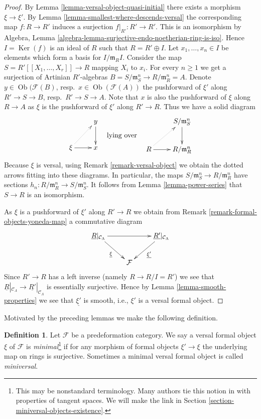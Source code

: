 \documentclass{stacks-project}
\theoremstyle{plain}
\theoremstyle{definition}
\newtheorem{definition}[subsection]{Definition}
\theoremstyle{remark}
\numberwithin{equation}{subsection}
\def\Ob{\mathop{\mathrm{Ob}}\nolimits}
\def\Ker{\mathop{\mathrm{Ker}}}
\begin{document}
\begin{proof}
By
Lemma \ref{lemma-versal-object-quasi-initial}
there exists a morphism $\xi \to \xi'$. By
Lemma \ref{lemma-smallest-where-descends-versal}
the corresponding map $f : R \to R'$ induces a surjection
$f|_{R'} : R' \to R'$. This is an isomorphism by
Algebra, Lemma \ref{algebra-lemma-surjective-endo-noetherian-ring-is-iso}.
Hence $I = \Ker(f)$ is an ideal of $R$ such that $R = R' \oplus I$.
Let $x_1, \ldots, x_n \in I$ be elements which form a basis for
$I/\mathfrak m_RI$. Consider the map
$S = R'[[X_1, \ldots, X_r]] \to R$ mapping $X_i$ to $x_i$.
For every $n \geq 1$ we get a surjection of Artinian $R'$-algebras
$B = S/\mathfrak m_S^n \to R/\mathfrak m_R^n = A$. Denote
$y \in \Ob(\mathcal{F}(B)$, resp.\ $x \in \Ob(\mathcal{F}(A))$
the pushforward of $\xi'$ along $R' \to S \to B$, resp.\ $R' \to S \to A$.
Note that $x$ is also the pushforward of $\xi$ along $R \to A$ as
$\xi$ is the pushforward of $\xi'$ along $R' \to R$.
Thus we have a solid diagram
$$
\vcenter{
\xymatrix{
& y \ar[d] \\
\xi \ar[r] \ar@{..>}[ru] & x
}
}
\quad\text{lying over}\quad
\vcenter{
\xymatrix{
& S/\mathfrak m_S^n \ar[d] \\
R \ar[r] \ar@{..>}[ru] & R/\mathfrak m_R^n
}
}
$$
Because $\xi$ is versal, using
Remark \ref{remark-versal-object}
we obtain the dotted arrows fitting into these diagrams.
In particular, the maps $S/\mathfrak m_S^n \to R/\mathfrak m_R^n$
have sections $h_n : R/\mathfrak m_R^n \to S/\mathfrak m_S^n$.
It follows from
Lemma \ref{lemma-power-series}
that $S \to R$ is an isomorphism.

\medskip\noindent
As $\xi$ is a pushforward of $\xi'$ along $R' \to R$ we obtain from
Remark \ref{remark-formal-objects-yoneda-map}
a commutative diagram
$$
\xymatrix{
\underline{R}|_{\mathcal{C}_\Lambda} \ar[rr] \ar[rd]_{\underline{\xi}} & &
\underline{R'}|_{\mathcal{C}_\Lambda} \ar[ld]^{\underline{\xi'}} \\
& \mathcal{F}
}
$$
Since $R' \to R$ has a left inverse (namely $R \to R/I = R'$) we see that
$\underline{R}|_{\mathcal{C}_\Lambda} \to
\underline{R'}|_{\mathcal{C}_\Lambda}$ is essentially surjective.
Hence by
Lemma \ref{lemma-smooth-properties}
we see that $\underline{\xi'}$ is smooth, i.e., $\xi'$ is a versal
formal object.
\end{proof}

\noindent
Motivated by the preceding lemmas we make the following definition.

\begin{definition}
\label{definition-minimal-versal}
Let $\mathcal{F}$ be a predeformation category.
We say a versal formal object $\xi$ of $\mathcal{F}$ is
{\it minimal}\footnote{This may be nonstandard terminology. Many
authors tie this notion in with properties of tangent spaces.
We will make the link in
Section \ref{section-miniversal-objects-existence}.}
if for any morphism of formal objects
$\xi' \to \xi$ the underlying map on rings is surjective.
Sometimes a minimal versal formal object is called {\it miniversal}.
\end{definition}
\end{document}
